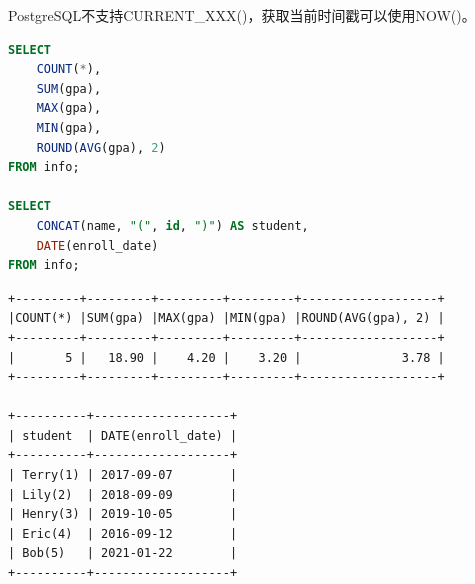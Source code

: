 \documentclass[12pt, openany, oneside]{book}
\begin{document}
\begin{table}[H]
    \centering
    \caption{日期函数}
\end{table}

PostgreSQL不支持CURRENT\_XXX()，获取当前时间戳可以使用NOW()。 \\


\begin{lstlisting}[language=SQL]
SELECT
    COUNT(*),
    SUM(gpa),
    MAX(gpa),
    MIN(gpa),
    ROUND(AVG(gpa), 2)
FROM info;

SELECT
    CONCAT(name, "(", id, ")") AS student, 
    DATE(enroll_date)
FROM info;
\end{lstlisting}

\begin{tcolorbox}
    \begin{verbatim}
+---------+---------+---------+---------+-------------------+
|COUNT(*) |SUM(gpa) |MAX(gpa) |MIN(gpa) |ROUND(AVG(gpa), 2) |
+---------+---------+---------+---------+-------------------+
|       5 |   18.90 |    4.20 |    3.20 |              3.78 |
+---------+---------+---------+---------+-------------------+

+----------+-------------------+
| student  | DATE(enroll_date) |
+----------+-------------------+
| Terry(1) | 2017-09-07        |
| Lily(2)  | 2018-09-09        |
| Henry(3) | 2019-10-05        |
| Eric(4)  | 2016-09-12        |
| Bob(5)   | 2021-01-22        |
+----------+-------------------+
	\end{verbatim}
\end{tcolorbox}
\end{document}

